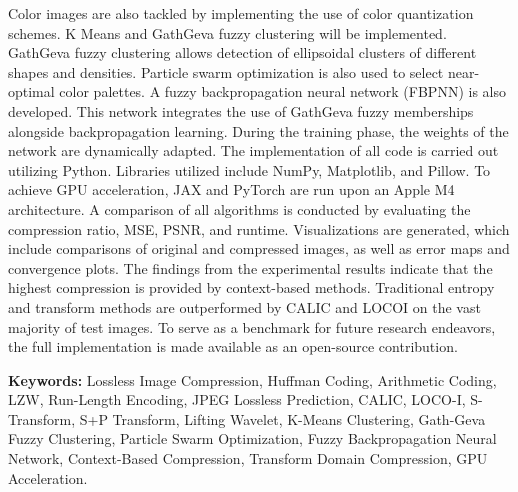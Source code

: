 Color images are also tackled by implementing the use of color quantization schemes. K Means and GathGeva fuzzy clustering will be implemented. GathGeva fuzzy clustering allows detection of ellipsoidal clusters of different shapes and densities. Particle swarm optimization is also used to select near-optimal color palettes. A fuzzy backpropagation neural network (FBPNN) is also developed. This network integrates the use of GathGeva fuzzy memberships alongside backpropagation learning. During the training phase, the weights of the network are dynamically adapted.
The implementation of all code is carried out utilizing Python. Libraries utilized include NumPy, Matplotlib, and Pillow. To achieve GPU acceleration, JAX and PyTorch are run upon an Apple M4 architecture. A comparison of all algorithms is conducted by evaluating the compression ratio, MSE, PSNR, and runtime. Visualizations are generated, which include comparisons of original and compressed images, as well as error maps and convergence plots.
The findings from the experimental results indicate that the highest compression is provided by context-based methods. Traditional entropy and transform methods are outperformed by CALIC and LOCOI on the vast majority of test images. To serve as a benchmark for future research endeavors, the full implementation is made available as an open-source contribution.


\vspace{1cm}

\noindent\textbf{Keywords:} Lossless Image Compression, Huffman Coding, Arithmetic Coding, LZW, Run-Length Encoding, JPEG Lossless Prediction, CALIC, LOCO-I, S-Transform, S+P Transform, Lifting Wavelet, K-Means Clustering, Gath-Geva Fuzzy Clustering, Particle Swarm Optimization, Fuzzy Backpropagation Neural Network, Context-Based Compression, Transform Domain Compression, GPU Acceleration.